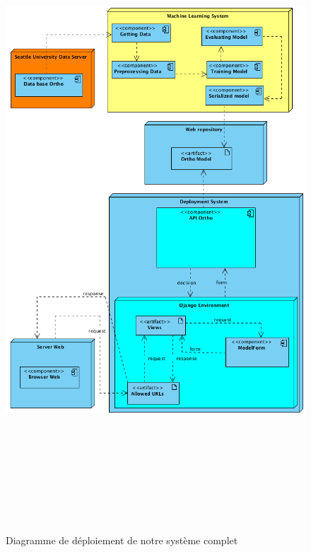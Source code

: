 \documentclass[12pt, french]{report}
\begin{document}
\begin{figure}[h]
	\includegraphics[width=17cm, height=24cm ]{images/deploymentdiag.png}
	\caption{Diagramme de déploiement de notre système complet}
	\label{deployment}
\end{figure} 

%
\end{document}
